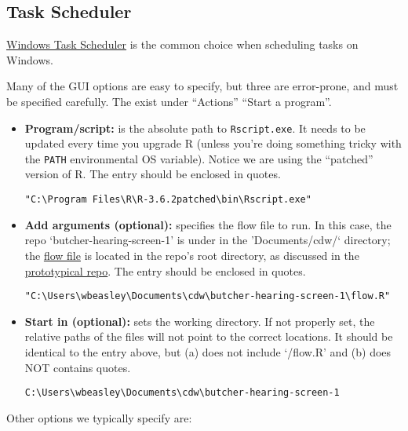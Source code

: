 \documentclass[
]{book}
\begin{document}
\hypertarget{automation-task-scheduler}{%
\subsection{Task Scheduler}\label{automation-task-scheduler}}

\href{https://en.wikipedia.org/wiki/Windows_Task_Scheduler}{Windows Task Scheduler} is the common choice when scheduling tasks on Windows.

Many of the GUI options are easy to specify, but three are error-prone, and must be specified carefully. The exist under ``Actions'' \textbar{} ``Start a program''.

\begin{itemize}
\item
  \textbf{Program/script:} is the absolute path to \texttt{Rscript.exe}. It needs to be updated every time you upgrade R (unless you're doing something tricky with the \texttt{PATH} environmental OS variable). Notice we are using the ``patched'' version of R. The entry should be enclosed in quotes.

\begin{verbatim}
"C:\Program Files\R\R-3.6.2patched\bin\Rscript.exe"
\end{verbatim}
\item
  \textbf{Add arguments (optional):} specifies the flow file to run. In this case, the repo `butcher-hearing-screen-1' is under in the 'Documents/cdw/` directory; the \protect\hyperlink{automation-flow}{flow file} is located in the repo's root directory, as discussed in the \protect\hyperlink{repo-flow}{prototypical repo}. The entry should be enclosed in quotes.

\begin{verbatim}
"C:\Users\wbeasley\Documents\cdw\butcher-hearing-screen-1\flow.R"
\end{verbatim}
\item
  \textbf{Start in (optional):} sets the working directory. If not properly set, the relative paths of the files will not point to the correct locations. It should be identical to the entry above, but (a) does not include `/flow.R' and (b) does NOT contains quotes.

\begin{verbatim}
C:\Users\wbeasley\Documents\cdw\butcher-hearing-screen-1
\end{verbatim}
\end{itemize}

Other options we typically specify are:
\end{document}
